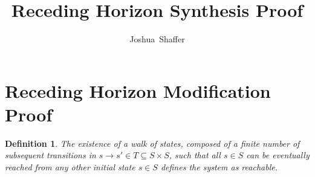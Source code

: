 \documentclass[journal]{IEEEtran}
\newtheorem{definition}{Definition}
\begin{document}
\title{Receding Horizon Synthesis Proof}



\author{Joshua~Shaffer%
	}%



\maketitle



%
\IEEEpeerreviewmaketitle

\section{Receding Horizon Modification Proof}



\begin{definition}
	\label{definition3}
	The existence of a walk of states, composed of a finite number of subsequent transitions in $s \to s' \in T \subseteq S \times S$, such that all $s \in S$ can be eventually reached from any other initial state $s \in S$ defines the system as reachable.
\end{definition}
\end{document}
